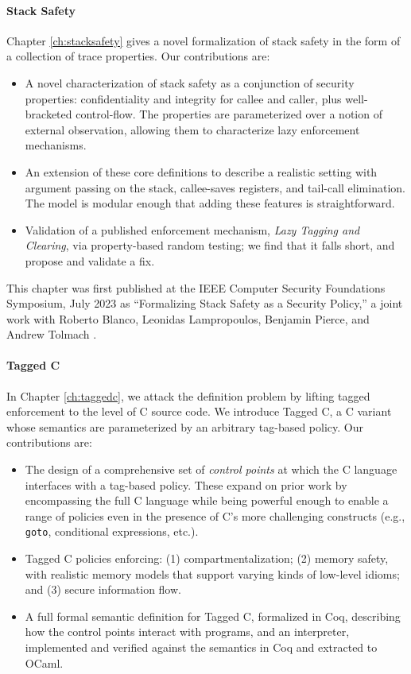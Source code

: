 \documentclass{report}
\begin{document}
\paragraph{Stack Safety}

Chapter \ref{ch:stacksafety} gives a novel formalization of stack safety in the
form of a collection of trace properties. Our contributions are:

\begin{itemize}
  \item A novel characterization of stack safety as a conjunction
        of security properties: confidentiality and integrity for callee
        and caller, plus well-bracketed control-flow.
        The properties are parameterized over a notion of
        external observation, allowing them to characterize lazy enforcement
        mechanisms.
  \item An extension of these core definitions to
        describe a realistic setting with argument passing on the stack,
        callee-saves registers, and tail-call elimination. The model is
        modular enough that adding these features is straightforward.
  \item Validation of a published enforcement mechanism,
        \emph{Lazy Tagging and Clearing}, via property-based random testing; we find that
        it falls short, and propose and validate a fix.
\end{itemize}

This chapter was first published at the IEEE Computer Security Foundations Symposium,
July 2023 as ``Formalizing Stack Safety as a Security Policy,'' a
joint work with Roberto Blanco, Leonidas Lampropoulos, Benjamin Pierce, and Andrew Tolmach
\cite{Anderson23:StackSafety}.

\paragraph{Tagged C}

In Chapter \ref{ch:taggedc}, we attack the definition problem by lifting tagged enforcement
to the level of C source code. We introduce Tagged C, a C variant whose semantics are parameterized
by an arbitrary tag-based policy. Our contributions are:

\begin{itemize}
\item The design of a comprehensive set of {\em control points} at which the C language interfaces
  with a tag-based policy. These expand on prior work by encompassing the full C language
  while being powerful enough to enable a range of policies even in the presence of C's more
  challenging constructs (e.g., {\tt goto}, conditional expressions, etc.).
\item Tagged C policies enforcing: (1) compartmentalization;
  (2) memory safety, with realistic memory models that support varying kinds of low-level idioms;
  and (3) secure information flow.
\item A full formal semantic definition for Tagged C, formalized in Coq, describing how the
  control points interact with programs, and an interpreter, implemented and verified against
  the semantics in Coq and extracted to OCaml.
\end{itemize}
\end{document}
